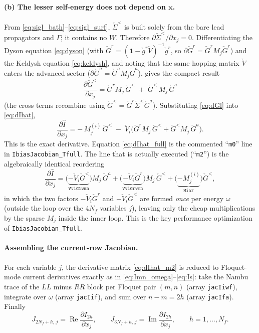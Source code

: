 \documentclass[11pt,a4paper]{article}
\newcommand{\id}{\mathbf{1}}          %
\newcommand{\Real}{\operatorname{Re}}
\newcommand{\Imag}{\operatorname{Im}}
\begin{document}
\paragraph{(b) The lesser self-energy does not depend on $\mathbf x$.}
From \eqref{eq:sigl_bath}--\eqref{eq:sigl_surf}, $\check\Sigma^<$ is built solely
from the bare lead propagators and $\Gamma$; it contains no $W$.  Therefore
$\partial\check\Sigma^</\partial x_j=0$.  Differentiating the Dyson equation
\eqref{eq:dyson} (with $\check G^r=(\id-\check g^r\check V)^{-1}\check g^r$,
so $\partial\check G^r=\check G^r M_j\check G^r$) and the Keldysh equation
\eqref{eq:keldysh}, and noting that the same hopping matrix $\check V$ enters the
advanced sector ($\partial\check G^a=\check G^a M_j\check G^a$), gives the compact
result
\begin{equation}
  \boxed{\;
  \frac{\partial \check G^<}{\partial x_j}
  = \check G^r M_j\,\check G^< \;+\; \check G^<\,M_j\,\check G^a \;}
  \label{eq:dGl}
\end{equation}
(the cross terms recombine using $\check G^<=\check G^r\check\Sigma^<\check G^a$).
Substituting \eqref{eq:dGl} into \eqref{eq:dIhat},
\begin{equation}
  \frac{\partial \hat I}{\partial x_j}
  = -\,M^{(i)}_j\,\check G^<
    \;-\;\check V_i\Big(\check G^r M_j\,\check G^< + \check G^<M_j\,\check G^a\Big).
  \label{eq:dIhat_full}
\end{equation}
This is the exact derivative.  Equation \eqref{eq:dIhat_full} is the commented
``\texttt{m0}'' line in \texttt{IbiasJacobian\_Tfull}.  The line that is actually executed
(``\texttt{m2}'') is the algebraically identical reordering
\begin{equation}
  \frac{\partial \hat I}{\partial x_j}
  = \big(\underbrace{-\check V_i\check G^<}_{\texttt{VviGlwmn}}\big)M_j\,\check G^a
   +\big(\underbrace{-\check V_i\check G^r}_{\texttt{VviGrwmn}}\big)M_j\,\check G^<
   +\big(\underbrace{-M^{(i)}_j}_{\texttt{Miar}}\big)\check G^<,
  \label{eq:dIhat_m2}
\end{equation}
in which the two factors $-\check V_i\check G^r$ and $-\check V_i\check G^<$ are
formed \emph{once} per energy $\omega$ (outside the loop over the $4N_f$
variables $j$), leaving only the cheap multiplications by the sparse $M_j$ inside
the inner loop.  This is the key performance optimization of \texttt{IbiasJacobian\_Tfull}.

\paragraph{Assembling the current-row Jacobian.}
For each variable $j$, the derivative matrix \eqref{eq:dIhat_m2} is reduced to
Floquet-mode current derivatives exactly as in
\eqref{eq:Imn_omega}--\eqref{eq:Is}: take the Nambu trace of the $LL$ minus $RR$
block per Floquet pair $(m,n)$ (array \texttt{jacIiwf}), integrate over $\omega$
(array \texttt{jacIif}), and sum over $n-m=2h$ (array \texttt{jacIfa}).  Finally
\begin{equation}
  J_{2N_f+h,\,j} = \Real\frac{\partial I_{2h}}{\partial x_j},
  \qquad
  J_{3N_f+h,\,j} = \Imag\frac{\partial I_{2h}}{\partial x_j},
  \qquad h=1,\dots,N_f.
  \label{eq:jac_current}
\end{equation}
\end{document}

